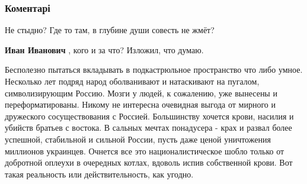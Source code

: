 
 
 
 
 
\subsubsection{Коментарі}
\label{sec:12_09_2021.fb.nikonov_sergej.3.vojna_zelenskii_rossia.cmt}

\begin{itemize} %
 
Не стыдно? Где то там, в глубине души совесть не жмёт?

\begin{itemize} %
 
\textbf{Иван Иванович} , кого и за что? Изложил, что думаю.
\end{itemize} %

 

Бесполезно пытаться вкладывать в подкастрюльное пространство что либо умное.
Несколько лет подряд народ оболванивают и натаскивают на пугалом,
символизирующим Россию.  Мозги у людей, к сожалению, уже вынесены и
переформатированы. Никому не интересна очевидная выгода от мирного и дружеского
сосуществования с Россией. Большинству хочется крови, насилия и убийств братьев
с востока. В сальных мечтах понадусера - крах и развал более успешной,
стабильной и сильной России, пусть даже ценой уничтожения миллионов украинцев.
Очнется все это националистическое шобло только от добротной оплеухи в
очередных котлах, вдоволь испив собственной крови.  Вот такая реальность или
действительность, как угодно.


\end{itemize}
